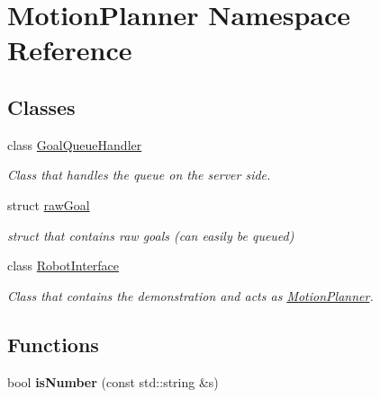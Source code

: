 \hypertarget{namespaceMotionPlanner}{}\section{Motion\+Planner Namespace Reference}
\label{namespaceMotionPlanner}
\subsection*{Classes}
\begin{DoxyCompactItemize}
\item 
class \hyperlink{classMotionPlanner_1_1GoalQueueHandler}{Goal\+Queue\+Handler}
\begin{DoxyCompactList}\small\item\em Class that handles the queue on the server side. \end{DoxyCompactList}\item 
struct \hyperlink{structMotionPlanner_1_1rawGoal}{raw\+Goal}
\begin{DoxyCompactList}\small\item\em struct that contains raw goals (can easily be queued) \end{DoxyCompactList}\item 
class \hyperlink{classMotionPlanner_1_1RobotInterface}{Robot\+Interface}
\begin{DoxyCompactList}\small\item\em Class that contains the demonstration and acts as \hyperlink{namespaceMotionPlanner}{Motion\+Planner}. \end{DoxyCompactList}\end{DoxyCompactItemize}
\subsection*{Functions}
\begin{DoxyCompactItemize}
\item 
bool {\bfseries is\+Number} (const std\+::string \&s)\hypertarget{namespaceMotionPlanner_ad668551c61a3d2b30ec1e91b66be5fcc}{}\label{namespaceMotionPlanner_ad668551c61a3d2b30ec1e91b66be5fcc}

\end{DoxyCompactItemize}
